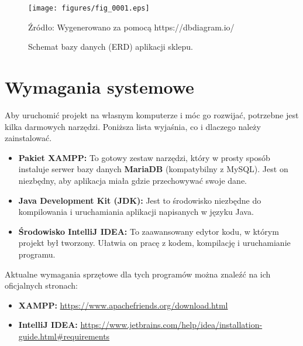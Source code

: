 \begin{figure}[H]
    \centering
    \texttt{[image: figures/fig\_0001.eps]}
    \caption{Schemat bazy danych (ERD) aplikacji sklepu.}
    \label{fig:erd_diagram}
    \small{Źródło: Wygenerowano za pomocą https://dbdiagram.io/}
\end{figure}
\clearpage

\section{Wymagania systemowe}
Aby uruchomić projekt na własnym komputerze i móc go rozwijać, potrzebne jest kilka darmowych narzędzi. Poniższa lista wyjaśnia, co i dlaczego należy zainstalować.
\begin{itemize}
    \item \textbf{Pakiet XAMPP:} To gotowy zestaw narzędzi, który w prosty sposób instaluje serwer bazy danych \textbf{MariaDB} (kompatybilny z MySQL). Jest on niezbędny, aby aplikacja miała gdzie przechowywać swoje dane.
    \item \textbf{Java Development Kit (JDK):} Jest to środowisko niezbędne do kompilowania i uruchamiania aplikacji napisanych w języku Java.
    \item \textbf{Środowisko IntelliJ IDEA:} To zaawansowany edytor kodu, w którym projekt był tworzony. Ułatwia on pracę z kodem, kompilację i uruchamianie programu.
\end{itemize}
Aktualne wymagania sprzętowe dla tych programów można znaleźć na ich oficjalnych stronach:
\begin{itemize}
    \item \textbf{XAMPP:} \url{https://www.apachefriends.org/download.html}
    \item \textbf{IntelliJ IDEA:} \url{https://www.jetbrains.com/help/idea/installation-guide.html#requirements}
\end{itemize}